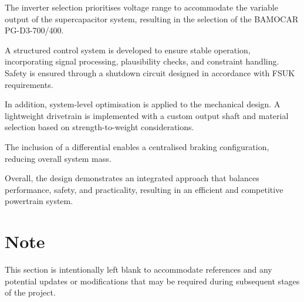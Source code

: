 \documentclass[11pt, a4paper]{report}
\numberwithin{equation}{section}
\begin{document}
The inverter selection prioritises voltage range to accommodate the variable output of the supercapacitor system, resulting in the selection of the BAMOCAR PG-D3-700/400.

A structured control system is developed to ensure stable operation, incorporating signal processing, plausibility checks, and constraint handling. Safety is ensured through a shutdown circuit designed in accordance with FSUK requirements.

In addition, system-level optimisation is applied to the mechanical design. A lightweight drivetrain is implemented with a custom output shaft and material selection based on strength-to-weight considerations.

The inclusion of a differential enables a centralised braking configuration, reducing overall system mass.

Overall, the design demonstrates an integrated approach that balances performance, safety, and practicality, resulting in an efficient and competitive powertrain system.

\section*{Note}

This section is intentionally left blank to accommodate references and any potential updates or modifications that may be required during subsequent stages of the project.

\printbibliography
\end{document}
